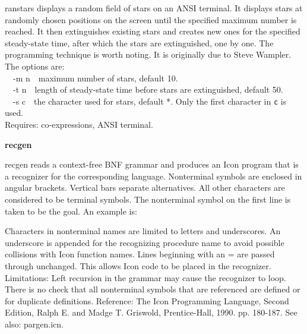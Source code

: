 {\textsf{ranstars} displays a random field of
{\textquotedbl}stars{\textquotedbl} on an ANSI terminal. It displays
stars at randomly chosen positions on the screen until
the specified maximum number is reached. It then extinguishes existing
stars and creates new ones for the specified steady-state time, after
which the stars are extinguished, one by one. The programming technique
is worth noting. It is originally due to Steve Wampler. The options
are:\\
\ \ \textsf{{}-m n}\ \ maximum number of stars, default 10.\\
\ \ \textsf{{}-t n}\ \ length of steady-state time before stars are
extinguished, default 50.\\
\ \ \textsf{{}-s c}\ \ the character used for
{\textquotedbl}stars{\textquotedbl}, default *. Only the first
character in \texttt{c} is used.\\
Requires: co-expressions, ANSI terminal.

{\sffamily\bfseries
recgen\ \ \ \ \ \ \ \ \ \ \ \ \ \ \ \ \ \ \ \ }

\textsf{recgen} reads a context-free BNF grammar and produces
an Icon program that is a recognizer for the corresponding language.
Nonterminal symbols are enclosed in angular brackets. Vertical bars
separate alternatives. All other characters are considered to be
terminal symbols. The nonterminal symbol on the first line is taken to
be the goal. An example is:


Characters in nonterminal names are limited to letters and underscores.
An underscore is appended for the recognizing procedure name to avoid
possible collisions with Icon function names. Lines beginning with an =
are passed through unchanged. This allows Icon code to be placed in the
recognizer. Limitations: Left recursion in the grammar
may cause the recognizer to loop. There is no check that all
nonterminal symbols that are referenced are defined or for duplicate
definitions. Reference: The Icon Programming Language, Second Edition,
Ralph E. and Madge T. Griswold, Prentice-Hall, 1990. pp. 180-187. See
also: \textsf{pargen.icn}.

}
